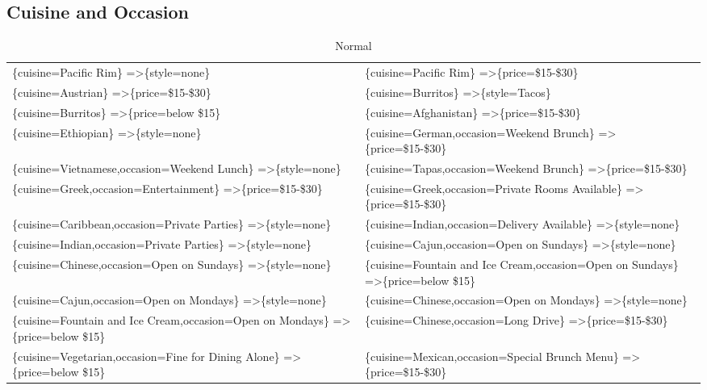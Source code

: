 \documentclass[letterpaper,10pt]{article}
\begin{document}
\begin{appendices}
\subsection*{Cuisine and Occasion}
\begin{table}[h]
\centering
\caption*{Normal}
\begin{adjustbox}{max width=\textwidth}
\begin{tabular}{ll}
\{cuisine=Pacific Rim\} =\textgreater \{style=none\} & \{cuisine=Pacific Rim\} =\textgreater \{price=\$15-\$30\} \\ 
\{cuisine=Austrian\} =\textgreater \{price=\$15-\$30\} & \{cuisine=Burritos\} =\textgreater \{style=Tacos\} \\ 
\{cuisine=Burritos\} =\textgreater \{price=below \$15\} & \{cuisine=Afghanistan\} =\textgreater \{price=\$15-\$30\} \\ 
\{cuisine=Ethiopian\} =\textgreater \{style=none\} & \{cuisine=German,occasion=Weekend Brunch\} =\textgreater \{price=\$15-\$30\} \\ 
\{cuisine=Vietnamese,occasion=Weekend Lunch\} =\textgreater \{style=none\} & \{cuisine=Tapas,occasion=Weekend Brunch\} =\textgreater \{price=\$15-\$30\} \\ 
\{cuisine=Greek,occasion=Entertainment\} =\textgreater \{price=\$15-\$30\} & \{cuisine=Greek,occasion=Private Rooms Available\} =\textgreater \{price=\$15-\$30\} \\ 
\{cuisine=Caribbean,occasion=Private Parties\} =\textgreater \{style=none\} & \{cuisine=Indian,occasion=Delivery Available\} =\textgreater \{style=none\} \\ 
\{cuisine=Indian,occasion=Private Parties\} =\textgreater \{style=none\} & \{cuisine=Cajun,occasion=Open on Sundays\} =\textgreater \{style=none\} \\ 
\{cuisine=Chinese,occasion=Open on Sundays\} =\textgreater \{style=none\} & \{cuisine=Fountain and Ice Cream,occasion=Open on Sundays\} =\textgreater \{price=below \$15\} \\ 
\{cuisine=Cajun,occasion=Open on Mondays\} =\textgreater \{style=none\} & \{cuisine=Chinese,occasion=Open on Mondays\} =\textgreater \{style=none\} \\ 
\{cuisine=Fountain and Ice Cream,occasion=Open on Mondays\} =\textgreater \{price=below \$15\} & \{cuisine=Chinese,occasion=Long Drive\} =\textgreater \{price=\$15-\$30\} \\ 
\{cuisine=Vegetarian,occasion=Fine for Dining Alone\} =\textgreater \{price=below \$15\} & \{cuisine=Mexican,occasion=Special Brunch Menu\} =\textgreater \{price=\$15-\$30\} \\ 

\end{tabular}
\end{adjustbox}
\end{table}
\end{appendices}
\end{document}
